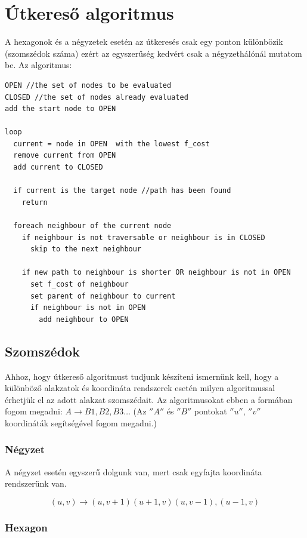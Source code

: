 \chapter{Útkereső algoritmus}

A hexagonok és a négyzetek esetén az útkeresés csak egy ponton különbözik (szomszédok száma) ezért az egyszerűség kedvért csak a négyzethálónál mutatom be.
\newline
\newline Az algoritmus:
\begin{verbatim}
OPEN //the set of nodes to be evaluated
CLOSED //the set of nodes already evaluated
add the start node to OPEN

loop
  current = node in OPEN  with the lowest f_cost
  remove current from OPEN
  add current to CLOSED

  if current is the target node //path has been found
    return

  foreach neighbour of the current node
    if neighbour is not traversable or neighbour is in CLOSED
      skip to the next neighbour

    if new path to neighbour is shorter OR neighbour is not in OPEN
      set f_cost of neighbour
      set parent of neighbour to current
      if neighbour is not in OPEN
        add neighbour to OPEN
\end{verbatim}

\section{Szomszédok}

Ahhoz, hogy útkereső algoritmust tudjunk készíteni ismernünk kell, hogy a különböző alakzatok és koordináta rendszerek esetén milyen algoritmussal érhetjük el az adott alakzat szomszédait. 
\newline
\newline Az algoritmusokat ebben a formában fogom megadni: $A \rightarrow B1, B2, B3 …$
(Az $''A''$ és $''B''$ pontokat $''u''$, $''v''$ koordináták segítségével fogom megadni.)

\subsection{Négyzet}
A négyzet esetén egyszerű dolgunk van, mert csak egyfajta koordináta rendszerünk van.

$$
(u,v) \rightarrow (u,v+1) (u+1,v) (u,v-1), (u-1,v)
$$

\subsection{Hexagon}

